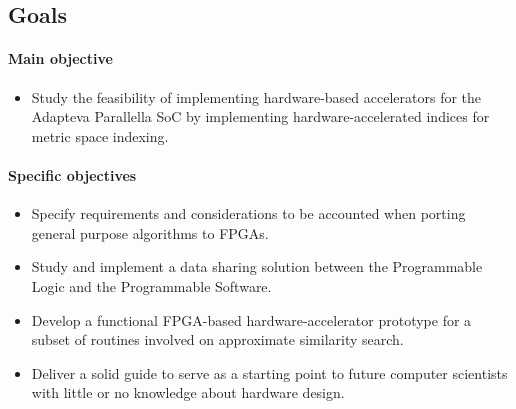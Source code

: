 \subsection{Goals}
\paragraph{Main objective}
\begin{itemize}
\item Study the feasibility of implementing hardware-based accelerators for the Adapteva Parallella SoC by implementing
hardware-accelerated indices for metric space indexing.
\end{itemize}

\paragraph{Specific objectives}
\begin{itemize}
    \item Specify requirements and considerations to be accounted when porting general purpose algorithms to FPGAs.
    \item Study and implement a data sharing solution between the Programmable Logic and the Programmable Software.
    \item Develop a functional FPGA-based hardware-accelerator prototype for a subset of routines involved 
    on approximate similarity search.
    \item Deliver a solid guide to serve as a starting point to future computer scientists with little or no 
    knowledge about hardware design. 
\end{itemize}